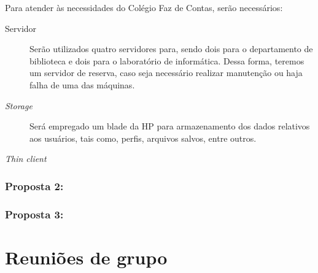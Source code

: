 \documentclass[a4paper,12pt]{report}
\begin{document}
            Para atender às necessidades do Colégio Faz de Contas, serão
            necessários:

            \begin{description}

                \item[Servidor] Serão utilizados quatro servidores para, sendo
                dois para o departamento de biblioteca e dois para o
                laboratório de informática. Dessa forma, teremos um servidor
                de reserva, caso seja necessário realizar manutenção ou
                haja falha de uma das máquinas.

                \item[\emph{Storage}] Será empregado um blade da HP para
                armazenamento dos dados relativos aos usuários, tais como,
                perfis, arquivos salvos, entre outros.

                \item[\emph{Thin client}]

            \end{description}

            \subsection{Proposta 2:}

            \subsection{Proposta 3:}

    \appendix

    \chapter{Reuniões de grupo}
\end{document}
